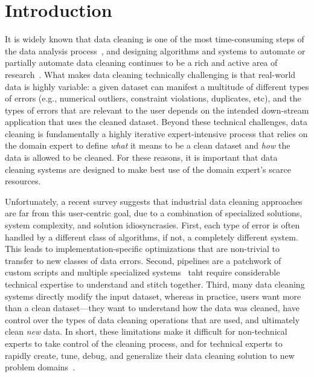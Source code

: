 \section{Introduction}\label{intro}\sloppy



It is widely known that data cleaning is one of the most time-consuming steps of the data analysis process~\cite{nytimes}, and
designing algorithms and systems to automate or partially automate data cleaning continues to be a rich and active area of research~\cite{DBLP:conf/sigmod/ChuIKW16}.
What makes data cleaning technically challenging is that real-world data is highly variable: a given dataset can manifest a multitude of different types of errors (e.g., numerical outliers, constraint violations, duplicates, etc), and the types of errors that are relevant to the user depends on the intended down-stream application that uses the cleaned dataset.
Beyond these technical challenges, data cleaning is fundamentally a highly iterative expert-intensive process that relies on the domain expert to define {\it what} it means to be a clean dataset and {\it how} the data is allowed to be cleaned.
For these reasons, it is important that data cleaning systems are designed to make best use of the domain expert's scarce resources.


Unfortunately, a recent survey suggests that industrial data cleaning approaches are far from this user-centric goal, due to a combination of specialized solutions, system complexity, and solution idiosyncrasies.  First, each type of error is often handled by a different class of algorithms, if not, a completely different system.  This leads to implementation-specific optimizations that are non-trivial to transfer to new classes of data errors.   Second, pipelines are a patchwork of custom scripts and multiple specialized systems~\cite{krishnan2016hilda} taht require considerable technical expertise to understand and stitch together.  Third, many data cleaning systems directly modify the input dataset, whereas in practice, users want more than a clean dataset---they want to understand how the data was cleaned, have control over the types of data cleaning operations that are used, and ultimately clean {\it new} data.  In short, these limitations make it difficult for non-technical experts to take control of the cleaning process, and for technical experts to rapidly create, tune, debug, and generalize their data cleaning solution to new problem domains~\cite{sculley2014machine,krishnan2016hilda}.


